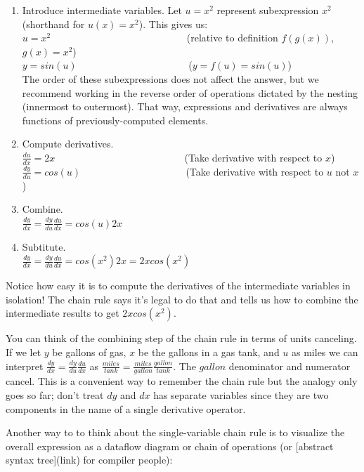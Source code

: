\documentclass[11pt]{article}
\begin{document}
\begin{enumerate}
	\item Introduce intermediate variables. Let $u = x^2$ represent subexpression $x^2$ (shorthand for $u(x) = x^2$). This gives us:\\
	$u = x^2$ ~~~~~~~~~~~~~~~~~~~~~~~~~~~(relative to definition $f(g(x))$, $g(x) = x^2$)\\
	$y = sin(u)$ ~~~~~~~~~~~~~~~~~~~~~~($y = f(u) = sin(u)$)\\
The order of these subexpressions does not affect the answer, but we recommend working in the reverse order of operations dictated by the nesting (innermost to outermost). That way, expressions and derivatives are always functions of previously-computed elements. 
	\item Compute derivatives.\\
	$\frac{du}{dx} = 2x$ ~~~~~~~~~~~~~~~~~~~~~~~~~ (Take derivative with respect to $x$)\\
	$\frac{dy}{du} = cos(u)$  ~~~~~~~~~~~~~~~~~~~~ (Take derivative with respect to $u$ not $x$)
	\item Combine.\\
	$\frac{dy}{dx} = \frac{dy}{du} \frac{du}{dx} = cos(u)2x$
	\item Subtitute.\\
	$\frac{dy}{dx} = \frac{dy}{du} \frac{du}{dx} = cos(x^2)2x = 2xcos(x^2)$	
\end{enumerate}

Notice how easy it is to compute the derivatives of the intermediate variables in isolation! The chain rule says it's legal to do that and tells us how to combine the intermediate results to get $2xcos(x^2)$.

You can think of the combining step of the chain rule in terms of units canceling. If we let $y$ be gallons of gas, $x$ be the gallons in a gas tank, and $u$ as miles we can interpret $\frac{dy}{dx} = \frac{dy}{du} \frac{du}{dx}$ as $\frac{miles}{tank} = \frac{miles}{gallon} \frac{gallon}{tank}$. The $gallon$ denominator and numerator cancel. This is a convenient way to remember the chain rule but the analogy only goes so far; don't treat $dy$ and $dx$ has separate variables since they are two components in the name of a single derivative operator.

Another way to to think about the single-variable chain rule is to visualize the overall expression as a dataflow diagram or chain of operations (or [abstract syntax tree](link) for compiler people):
\end{document}
